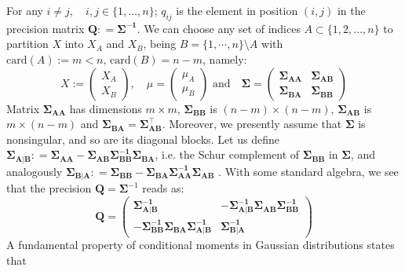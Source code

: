\documentclass[openany, 11pt, oneside]{book}
\begin{document}
For any $i \neq j,  \quad i,j \in \lbrace 1, \dots, n \rbrace$; $q_{ij}$ is the element in position $(i,j)$ in the precision matrix $\boldsymbol{Q}: = \boldsymbol{\Sigma^{-1}}$. We can choose any set of indices $A \subset \lbrace1, 2, \dots, n\rbrace$ to partition $X$ into $X_A$ and $X_B$, being $B = \lbrace 1, \cdots, n\rbrace \setminus A$ with $\mathrm{card}(A) := m<n, \, \mathrm{card}(B) = n-m$, namely:
%
	$$
	X := \left( \begin{array}{l} X_A \\ X_B
		\end{array}
	\right)  , \quad 
		\mu = \left( \begin{array}{l} \mu_A \\ \mu_B
	\end{array}
	\right)  \,\, \text{and} \quad 
	\boldsymbol{\Sigma} = \left( \begin{array}{ll} \boldsymbol{\Sigma_{AA}} & \boldsymbol{\Sigma_{AB}}
		 \\ \boldsymbol{\Sigma_{BA}} & \boldsymbol{\Sigma_{BB}}
	\end{array}
	\right)
	$$
% 
Matrix $\boldsymbol{\Sigma_{AA}}$ has dimensions $m \times m$, $\boldsymbol{\Sigma_{BB}}$ is $(n-m) \times (n-m)$,	$\boldsymbol{\Sigma_{AB}}$ is $m \times (n-m)$ and $\boldsymbol{\Sigma_{BA}} = \boldsymbol{\Sigma_{AB}^\top}$. Moreover, we presently assume that $\boldsymbol{\Sigma}$ is nonsingular, and so are its diagonal blocks. Let us define $\boldsymbol{\Sigma_{A \vert B}} : =\boldsymbol{\Sigma_{AA}} - \boldsymbol{\Sigma_{AB}} \boldsymbol{\Sigma^{-1}_{BB}} \boldsymbol{\Sigma_{BA}}$, i.e. the Schur complement of $\boldsymbol{\Sigma_{BB}}$ in $\boldsymbol{\Sigma}$, and analogously $\boldsymbol{\Sigma_{B \vert A}} : =\boldsymbol{\Sigma_{BB}} - \boldsymbol{\Sigma_{BA}} \boldsymbol{\Sigma^{-1}_{AA}} \boldsymbol{\Sigma_{AB}}$ . With some standard algebra, we see that the precision $\boldsymbol{Q} = \boldsymbol{\Sigma}^{-1}$ reads as:
%
\begin{equation}
\boldsymbol{Q} = 
\left( \begin{array}{ll} 
	\boldsymbol{\Sigma_{A \vert B}^{-1}}   &
	-\boldsymbol{\Sigma_{A \vert B}^{-1}} \boldsymbol{\Sigma_{AB}} \boldsymbol{\Sigma_{BB}^{-1}}\\ 
	-\boldsymbol{\Sigma_{BB}^{-1}} \boldsymbol{\Sigma_{BA}} \boldsymbol{\Sigma_{A \vert B}^{-1}}& 
	\boldsymbol{\Sigma_{B \vert A}^{-1}}  
\end{array} \right)
\label{eq:precision_compact}
\end{equation}
%
A fundamental property of conditional moments in Gaussian distributions \cite[see][Result 4.6]{JohnsonWichern} states that 
\end{document}
